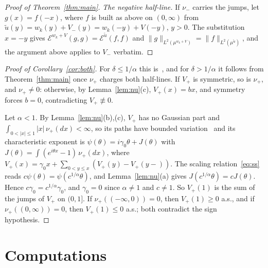\documentclass[11pt]{amsart}
\theoremstyle{remark}
\newcommand{\cE}{\mathcal E}
\begin{document}
\begin{proof}[Proof of Theorem~\ref{thm:main}]
\emph{The negative half-line.} If $\nu_-$ carries the jumps, let $g(x)=f(-x)$, where $f$ is built as above on $(0,\infty)$ from $\tilde u(y)=w_k(y)+V_-(y)=w_k(-y)+V(-y)$, $y>0$. The substitution $x=-y$ gives $\cE^{w_k+V}(g,g)=\cE^{\tilde u}(f,f)$ and $\|g\|_{L^2(\mu^{w_k+V})}=\|f\|_{L^2(\mu^{\tilde u})}$, and the argument above applies to $V_-$ verbatim.
\end{proof}

\begin{proof}[Proof of Corollary~\ref{cor:both}]
For $\delta\le1/\alpha$ this is~\cite[Proposition~5.2]{SW}, and for $\delta>1/\alpha$ it follows from Theorem~\ref{thm:main} once $\nu_+$ charges both half-lines. If $V_+$ is symmetric, so is $\nu_+$, and $\nu_+\ne0$: otherwise, by Lemma~\ref{lem:nu}(c), $V_+(x)=bx$, and symmetry forces $b=0$, contradicting $V_+\not\equiv0$.

Let $\alpha<1$. By Lemma~\ref{lem:nu}(b),(c), $V_+$ has no Gaussian part and $\int_{0<|x|\le1}|x|\,\nu_+(dx)<\infty$, so its paths have bounded variation~\cite[Theorem~21.9]{Sato} and its characteristic exponent is $\psi(\theta)=i\gamma_0\theta+J(\theta)$ with $J(\theta)=\int(e^{i\theta x}-1)\,\nu_+(dx)$, where $V_+(x)=\gamma_0x+\sum_{0<y\le x}(V_+(y)-V_+(y-))$. The scaling relation~\eqref{eq:ss} reads $c\psi(\theta)=\psi(c^{1/\alpha}\theta)$, and Lemma~\ref{lem:nu}(a) gives $J(c^{1/\alpha}\theta)=cJ(\theta)$. Hence $c\gamma_0=c^{1/\alpha}\gamma_0$, and $\gamma_0=0$ since $\alpha\ne1$ and $c\ne1$. So $V_+(1)$ is the sum of the jumps of $V_+$ on $(0,1]$. If $\nu_+((-\infty,0))=0$, then $V_+(1)\ge0$ a.s., and if $\nu_+((0,\infty))=0$, then $V_+(1)\le0$ a.s.; both contradict the sign hypothesis.
\end{proof}

\section{Computations}\label{sec:checks}
\end{document}
